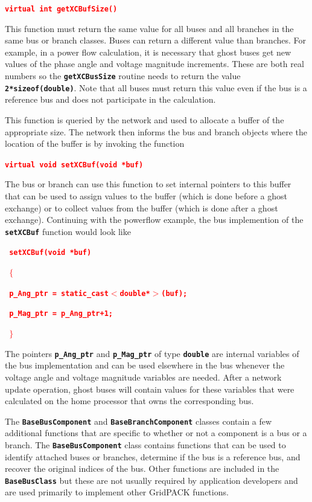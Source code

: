 \documentclass[12pt]{report} %
\begin{document}
\textcolor{red}{\texttt{\textbf{virtual int getXCBufSize()}}}

This function must return the same value for all buses and all branches in the same bus or branch classes. Buses can return a different value than branches. For example, in a power flow calculation, it is necessary that ghost buses get new values of the phase angle and voltage magnitude increments. These are both real numbers so the \texttt{\textbf{getXCBusSize}} routine needs to return the value \texttt{\textbf{2*sizeof(double)}}. Note that all buses must return this value even if the bus is a reference bus and does not participate in the calculation.

This function is queried by the network and used to allocate a buffer of the appropriate size. The network then informs the bus and branch objects where the location of the buffer is by invoking the function

\textcolor{red}{\texttt{\textbf{virtual void setXCBuf(void *buf)}}}

The bus or branch can use this function to set internal pointers to this buffer that can be used to assign values to the buffer (which is done before a ghost exchange) or to collect values from the buffer (which is done after a ghost exchange). Continuing with the powerflow example, the bus implemention of the \texttt{\textbf{setXCBuf}} function would look like

\textcolor{red}{\texttt{\textbf{    setXCBuf(void *buf)}}}

\textcolor{red}{\texttt{\textbf{    $\boldsymbol{\mathrm{\{}}$}}}

\textcolor{red}{\texttt{\textbf{      p\_Ang\_ptr = static\_cast$\boldsymbol{\mathrm{<}}$double*$\boldsymbol{\mathrm{>}}$(buf);}}}

\textcolor{red}{\texttt{\textbf{      p\_Mag\_ptr = p\_Ang\_ptr+1;}}}

\textcolor{red}{\texttt{\textbf{    $\boldsymbol{\mathrm{\}}}$}}}

The pointers \texttt{\textbf{p\_Ang\_ptr}} and \texttt{\textbf{p\_Mag\_ptr}} of type \texttt{\textbf{double}} are internal variables of the bus implementation and can be used elsewhere in the bus whenever the voltage angle and voltage magnitude variables are needed. After a network update operation, ghost buses will contain values for these variables that were calculated on the home processor that owns the corresponding bus.

The \texttt{\textbf{BaseBusComponent}} and \texttt{\textbf{BaseBranchComponent}} classes contain a few additional functions that are specific to whether or not a component is a bus or a branch. The \texttt{\textbf{BaseBusComponent}} class contains functions that can be used to identify attached buses or branches, determine if the bus is a reference bus, and recover the original indices of the bus. Other functions are included in the \texttt{\textbf{BaseBusClass}} but these are not usually required by application developers and are used primarily to implement other GridPACK functions.
\end{document}
